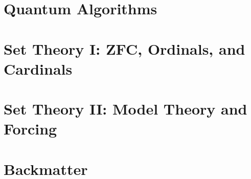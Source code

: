 \documentclass[11pt,numbers=noenddot]{scrreprt}
\begin{document}
\part{Quantum Algorithms}




\part{Set Theory I: ZFC, Ordinals, and Cardinals}





\part{Set Theory II: Model Theory and Forcing}




\part{Backmatter}
\appendix



\clearpage
\printbibliography



%
%
\end{document}
